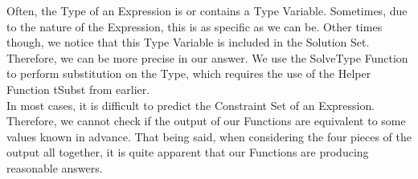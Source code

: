 \documentclass{article}
\begin{document}
Often, the Type of an Expression is or contains a Type Variable. Sometimes, due to the nature of the Expression, this is as specific as we can be. Other times though, we notice that this Type Variable is included in the Solution Set. Therefore, we can be more precise in our answer. We use the SolveType Function to perform substitution on the Type, which requires the use of the Helper Function tSubst from earlier.\\

In most cases, it is difficult to predict the Constraint Set of an Expression. Therefore, we cannot check if the output of our Functions are equivalent to some values known in advance. That being said, when considering the four pieces of the output all together, it is quite apparent that our Functions are producing reasonable answers.
\end{document}
